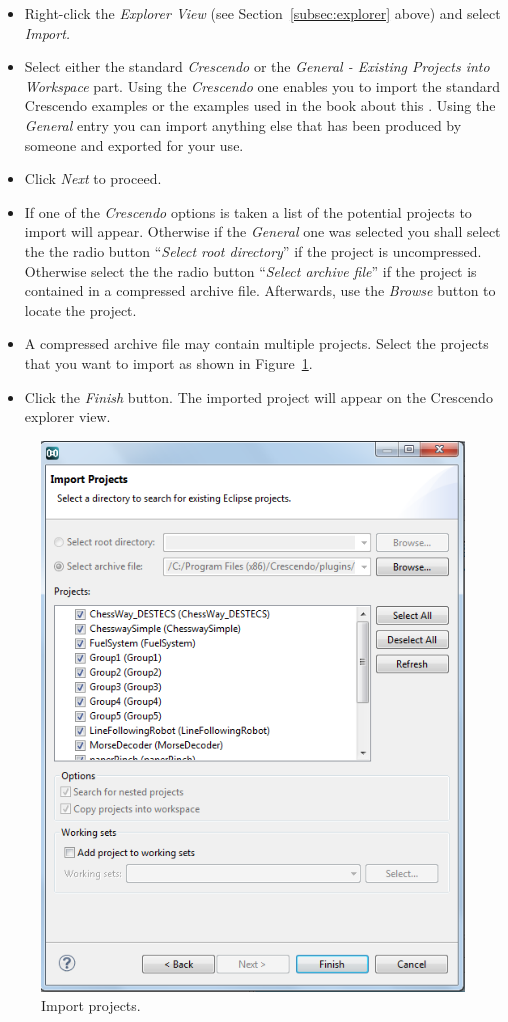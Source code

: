 \documentclass{crescendorepchap}
\begin{document}
\begin{itemize}
\item
  Right-click the \emph{Explorer View} (see Section~\ref{subsec:explorer} above)  and
  select \emph{Import.}
\item
  Select either the standard \emph{Crescendo} or the \emph{General - Existing Projects into
  Workspace} part. Using the \emph{Crescendo} one enables you to import the standard Crescendo examples or the examples used in the book about this \cite{Fitzgerald&13a}. Using the \emph{General} entry you can import anything else that has been produced by someone and exported for your use.
\item
  Click \emph{Next} to proceed.
\item
  If one of the \emph{Crescendo} options is taken a list of the potential projects to import will appear. Otherwise if the  \emph{General} one was selected you shall select the the radio button ``\emph{Select root directory}'' if the project
  is uncompressed. Otherwise select the the radio button ``\emph{Select archive
  file}'' if the project is contained in a compressed archive file. Afterwards, use
  the \emph{Browse} button to locate the project.
\item
  A compressed archive file may contain multiple projects. Select
  the projects that you want to import as shown in Figure~\ref{fig:importproject}.
\item
  Click the \emph{Finish} button. The imported project will appear on
  the Crescendo explorer view.
\end{itemize}

\begin{figure}[htbp]
\centering
\includegraphics[width=.6\textwidth]{images/DestecsImportProject.png}
\caption{Import projects.\label{fig:importproject}}
\end{figure}
\end{document}
